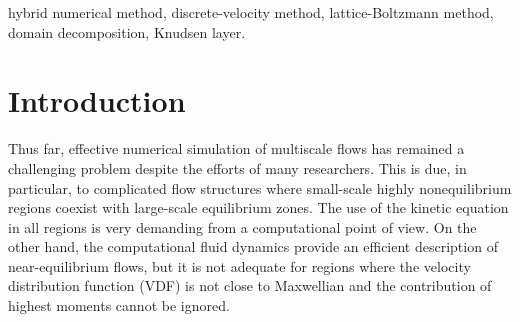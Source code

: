\documentclass{elsarticle} %
\begin{document}
\begin{frontmatter}
\begin{abstract}
\end{abstract}

\begin{keyword}
hybrid numerical method,
discrete-velocity method,
lattice-Boltzmann method,
domain decomposition,
Knudsen layer.
\end{keyword}

\end{frontmatter}

\tableofcontents

\section{Introduction}\label{sec:intro}

Thus far, effective numerical simulation of multiscale flows has remained a challenging problem despite the efforts of many researchers.
This is due, in particular, to complicated flow structures where small-scale highly nonequilibrium regions
coexist with large-scale equilibrium zones.
The use of the kinetic equation in all regions is very demanding from a computational point of view.
On the other hand, the computational fluid dynamics provide an efficient description of near-equilibrium flows,
but it is not adequate for regions where the velocity distribution function (VDF) is not close to Maxwellian
and the contribution of highest moments cannot be ignored.
\end{document}
